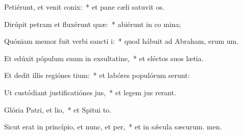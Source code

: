 \item Petiérunt, et venit conix:~* et pane cæli satuvit os.
\item Dirúpit petram et fluxérunt quæ:~* abiérunt in co mina;
\item Quóniam memor fuit verbi sancti i:~* quod hábuit ad Abraham, erum um.
\item Et edúxit pópulum suum in exsultatine,~* et eléctos suos  lætia.
\item Et dedit illis regiónes tium:~* et labóres populórum serunt:
\item Ut custódiant justificatiónes jus,~* et legem jus rerant.
\item Glória Patri, et lio,~* et Spitui to.
\item Sicut erat in princípio, et nunc, et per,~* et in sǽcula sæcurum. men.
